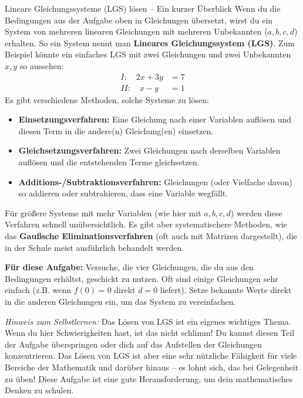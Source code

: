 \begin{infoboxumgebung}{Lineare Gleichungssysteme (LGS) lösen – Ein kurzer Überblick}
Wenn du die Bedingungen aus der Aufgabe oben in Gleichungen übersetzt, wirst du ein System von mehreren linearen Gleichungen mit mehreren Unbekannten ($a,b,c,d$) erhalten. So ein System nennt man \textbf{Lineares Gleichungssystem (LGS)}.
Zum Beispiel könnte ein einfaches LGS mit zwei Gleichungen und zwei Unbekannten $x,y$ so aussehen:
\begin{align*}
    I: \quad 2x + 3y &= 7 \\
    II: \quad x - y &= 1
\end{align*}
Es gibt verschiedene Methoden, solche Systeme zu lösen:
\begin{itemize}
    \item \textbf{Einsetzungsverfahren:} Eine Gleichung nach einer Variablen auflösen und diesen Term in die andere(n) Gleichung(en) einsetzen.
    \item \textbf{Gleichsetzungsverfahren:} Zwei Gleichungen nach derselben Variablen auflösen und die entstehenden Terme gleichsetzen.
    \item \textbf{Additions-/Subtraktionsverfahren:} Gleichungen (oder Vielfache davon) so addieren oder subtrahieren, dass eine Variable wegfällt.
\end{itemize}
Für größere Systeme mit mehr Variablen (wie hier mit $a,b,c,d$) werden diese Verfahren schnell unübersichtlich. Es gibt aber systematischere Methoden, wie das \textbf{Gaußsche Eliminationsverfahren} (oft auch mit Matrizen dargestellt), die in der Schule meist ausführlich behandelt werden.

\textbf{Für diese Aufgabe:}
Versuche, die vier Gleichungen, die du aus den Bedingungen erhältst, geschickt zu nutzen. Oft sind einige Gleichungen sehr einfach (z.B. wenn $f(0)=0$ direkt $d=0$ liefert). Setze bekannte Werte direkt in die anderen Gleichungen ein, um das System zu vereinfachen.

\textit{Hinweis zum Selbstlernen:} Das Lösen von LGS ist ein eigenes wichtiges Thema. Wenn du hier Schwierigkeiten hast, ist das nicht schlimm! Du kannst diesen Teil der Aufgabe überspringen oder dich auf das Aufstellen der Gleichungen konzentrieren. Das Lösen von LGS ist aber eine sehr nützliche Fähigkeit für viele Bereiche der Mathematik und darüber hinaus – es lohnt sich, das bei Gelegenheit zu üben! Diese Aufgabe ist eine gute Herausforderung, um dein mathematisches Denken zu schulen.
\end{infoboxumgebung}

